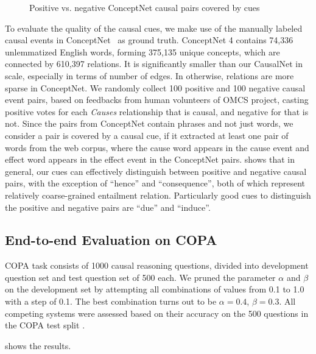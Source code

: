 \begin{figure}[th]
\centering
{}
\caption{Positive vs. negative ConceptNet causal pairs covered by cues}
\label{fig:pattern2}
\end{figure}

To evaluate the quality of the causal cues, we make use of the
manually labeled causal events in
ConceptNet~\cite{liu2004commonsense} as ground truth. ConceptNet 4
contains 74,336 unlemmatized English words, forming
375,135 unique concepts, which are connected by 610,397 relations.
It is significantly smaller than our CausalNet in scale, 
especially in terms of number of edges. In otherwise, relations are
more sparse in ConceptNet.
We randomly collect 100 positive and 100 negative causal event pairs, 
based on feedbacks from human volunteers of OMCS project, casting positive
votes for each \emph{Causes} relationship that is causal, and
negative for that is not. Since the pairs from ConceptNet contain
phrases and not just words, we consider a pair is covered by a
causal cue, if it extracted at least one pair of words from the web
corpus, where the cause word appears in the cause event and effect
word appears in the effect event in the ConceptNet pairs.
 shows that in general, our cues can
effectively distinguish between positive and negative causal pairs,
with the exception of ``hence'' and ``consequence'', both of which
represent relatively coarse-grained entailment relation.
Particularly good cues to distinguish the positive and negative
pairs are ``due'' and ``induce''.

\subsection{End-to-end Evaluation on COPA}
COPA task consists of 1000 causal reasoning questions, divided into 
development question set and test question set of 500 each.
We pruned the parameter $\alpha$ and $\beta$ on the development set
by attempting all combinations of values
from  0.1 to 1.0 with a step of 0.1. The best combination turns out to be
$\alpha=0.4$, $\beta=0.3$.
All competing systems were assessed based on their
accuracy on the 500 questions in the COPA test split \cite{gordon2012copa}. 

 shows the results.


